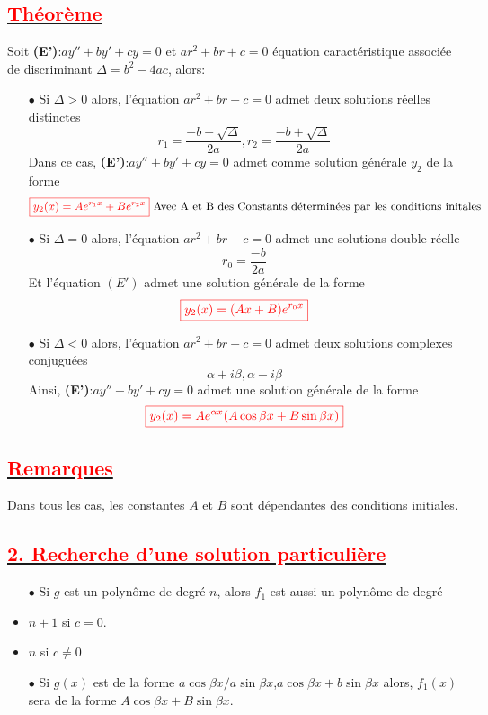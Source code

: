 \documentclass{article}
\begin{document}
\subsection*{\underline{\textbf{\textcolor{red}{Théorème}}}}
Soit \textbf{(E')}:$ay''+by'+cy=0$ et $ar^{2}+br+c=0$ équation caractéristique associée de discriminant $\Delta=b^{2}-4ac$, alors:
\begin{itemize}
    \item[$\bullet$] Si $\Delta >0$ alors, l'équation $ar^{2}+br+c=0$ admet deux solutions réelles distinctes \[r_{1}=\frac{-b-\sqrt{\Delta}}{2a}, r_{2}=\frac{-b+\sqrt{\Delta}}{2a}\]
    Dans ce cas, \textbf{(E')}:$ay''+by'+cy=0$ admet comme solution générale $y_{2}$ de la forme\\
    \[\textcolor{red}{ \boxed{ y_{2}(x)=Ae^{r_{1}x}+Be^{r_{2}x} } }\text{ Avec A et B des Constants déterminées par les conditions initales}\]
    \item[$\bullet$] Si $\Delta = 0$ alors, l'équation $ar^{2}+br+c=0$ admet une solutions double réelle \[r_{0}=\frac{-b}{2a}\]
    Et l'équation $(E')$ admet une solution générale de la forme 
    \[\textcolor{red}{ \boxed{ y_{2}(x)=(Ax+B)e^{r_{0}x} } }\]
    \item[$\bullet$] Si $\Delta <0$ alors, l'équation $ar^{2}+br+c=0$ admet deux solutions complexes conjuguées \[\alpha + i\beta, \alpha - i\beta\]
    Ainsi, \textbf{(E')}:$ay''+by'+cy=0$ admet une solution générale de la forme 
     \[\textcolor{red}{ \boxed{ y_{2}(x)=Ae^{\alpha x}(A\cos \beta x+B\sin \beta x) } }\]
\end{itemize}
\subsection*{\underline{\textbf{\textcolor{red}{Remarques}}}}
Dans tous les cas, les constantes $A$ et $B$ sont dépendantes des conditions initiales.
\subsection*{\underline{\textbf{\textcolor{red}{2. Recherche d'une solution particulière}}}}
\begin{itemize}
    \item[$\bullet$ ] Si $g$ est un polynôme de degré $n$, alors $f_{1}$ est aussi un polynôme de degré
    \item $n+1$ si $c=0$.
    \item $n$ si $c\neq 0$
    \item[$\bullet$ ] Si $g(x)$ est de la forme \( a\cos \beta x / a\sin \beta x \),\( a\cos \beta x + b\sin \beta x \) alors, $f_{1}(x)$ sera de la forme \( A\cos \beta x + B\sin \beta x \).
\end{itemize}
\end{document}
